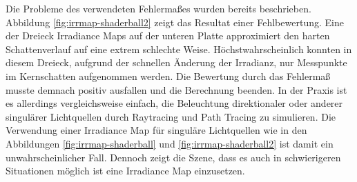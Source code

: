 		Die Probleme des verwendeten Fehlermaßes wurden bereits beschrieben.
		Abbildung \ref{fig:irrmap-shaderball2} zeigt das Resultat einer Fehlbewertung.
		Eine der Dreieck Irradiance Maps auf der unteren Platte approximiert den harten Schattenverlauf auf eine extrem schlechte Weise.
		Höchstwahrscheinlich konnten in diesem Dreieck, aufgrund der schnellen Änderung der Irradianz, nur Messpunkte im Kernschatten aufgenommen werden.
		Die Bewertung durch das Fehlermaß musste demnach positiv ausfallen und die Berechnung beenden.
		In der Praxis ist es allerdings vergleichsweise einfach, die Beleuchtung direktionaler oder anderer singulärer Lichtquellen durch Raytracing und Path Tracing zu simulieren.
		Die Verwendung einer Irradiance Map für singuläre Lichtquellen wie in den Abbildungen \ref{fig:irrmap-shaderball} und \ref{fig:irrmap-shaderball2} ist damit ein unwahrscheinlicher Fall.
		Dennoch zeigt die Szene, dass es auch in schwierigeren Situationen möglich ist eine Irradiance Map einzusetzen.

